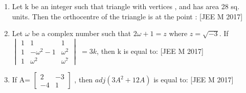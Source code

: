 \documentclass[journal,,12pt,twocolumn]{IEEEtran}
\theoremstyle{remark}
\begin{document}
\begin{enumerate}
    \item Let k be an integer such that triangle with vertices ,  and  has area 28 sq. units. Then the orthocentre of the triangle is at the point :
    \hfill{[JEE M 2017]}
    \begin{enumerate}
    \end{enumerate}
    \item Let $\omega$ be a complex number such that $2\omega + 1=z$ where $z=\sqrt{-3}$. If $\begin{vmatrix}
1 & 1  & 1 \\
1 & -\omega^2-1 & \omega^2 \\
1 & \omega^2 & \omega^7 
\end{vmatrix}$ $=3k$, then k is equal to:
\hfill{[JEE M 2017]}
\begin{enumerate}
\end{enumerate}
\item If A= $\begin{bmatrix}
    2 & -3 \\
    -4 & 1
\end{bmatrix}$
    , then $adj(3A^2+12A)$ is equal to:
\hfill{[JEE M 2017]}
\begin{enumerate}
\end{enumerate}
\end{enumerate}
\end{document}
